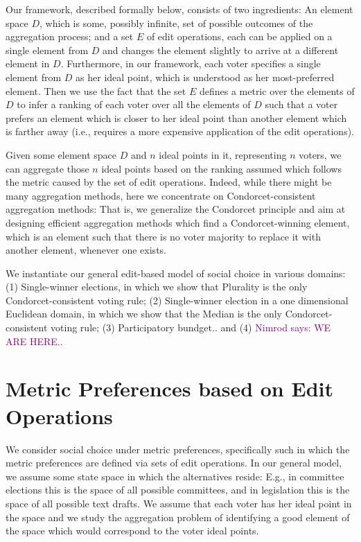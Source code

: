\documentclass{llncs}
\newcommand{\nimrod}[1]{\textcolor{purple}{Nimrod says: #1}}
\begin{document}
Our framework, described formally below, consists of two ingredients:
  An element space $D$, which is some, possibly infinite, set of possible outcomes of the aggregation process;
  and a set $E$ of edit operations, each can be applied on a single element from $D$ and changes the element slightly to arrive at a different element in $D$.
Furthermore, in our framework, each voter specifies a single element from $D$ as her ideal point, which is understood as her most-preferred element. Then we use the fact that the set $E$ defines a metric over the elements of $D$ to infer a ranking of each voter over all the elements of $D$ such that a voter prefers an element which is closer to her ideal point than another element which is farther away (i.e., requires a more expensive application of the edit operations).

Given some element space $D$ and $n$ ideal points in it, representing $n$ voters, we can aggregate those $n$ ideal points based on the ranking assumed which follows the metric caused by the set of edit operations. Indeed, while there might be many aggregation methods, here we concentrate on Condorcet-consistent aggregation methods:
  That is, we generalize the Condorcet principle and aim at designing efficient aggregation methods which find a Condorcet-winning element, which is an element such that there is no voter majority to replace it with another element, whenever one exists.
  
We instantiate our general edit-based model of social choice in various domains:
  (1) Single-winner elections, in which we show that Plurality is the only Condorcet-consistent voting rule;
  (2) Single-winner election in a one dimensional Euclidean domain, in which we show that the Median is the only Condorcet-consistent voting rule;
  (3) Participatory bundget..
  and (4) \nimrod{WE ARE HERE..}



\section{Metric Preferences based on Edit Operations}

We consider social choice under metric preferences, specifically such in which the metric preferences are defined via sets of edit operations.
In our general model, we assume some state space in which the alternatives reside:
  E.g., in committee elections this is the space of all possible committees, and in legislation this is the space of all possible text drafts.
We assume that each voter has her ideal point in the space and we study the aggregation problem of identifying a good element of the space which would correspond to the voter ideal points.
\end{document}
